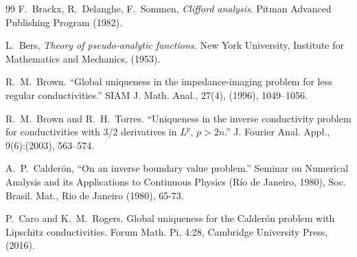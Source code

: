 \documentclass[12pt]{article}
\begin{document}
\begin{thebibliography}{99}
 F.~Brackx, R.~Delanghe, F.~Sommen, {\em Clifford
    analysis}. Pitman Advanced Publishing Program (1982).

	

 L.~Bers,  {\em Theory of pseudo-analytic functions.}
  New York University, Institute for Mathematics and Mechanics, (1953).


 R.~M.~Brown. ``Global uniqueness in the impedance-imaging problem for less regular
conductivities.'' SIAM J. Math. Anal., 27(4), (1996), 1049–1056.

R.~M.~Brown and R.~H.~Torres. ``Uniqueness in the inverse conductivity problem for conductivities with 3/2 derivatives in $L^p$, $p > 2n$.'' J. Fourier Anal. Appl., 9(6):(2003), 563–574.

 A.~P.~Calder\'{o}n, ``On an inverse boundary value problem.'' Seminar on Numerical Analysis and its Applications to Continuous Physics (R\'{i}o de Janeiro, 1980), Soc. Brasil. Mat., Rio de Janeiro (1980), 65-73.

 P.~Caro and K.~M.~Rogers. Global uniqueness for the Calder\'{o}n problem with Lipschitz conductivities. Forum Math. Pi, 4:28, Cambridge University Press, (2016).






\end{thebibliography}
\end{document}
